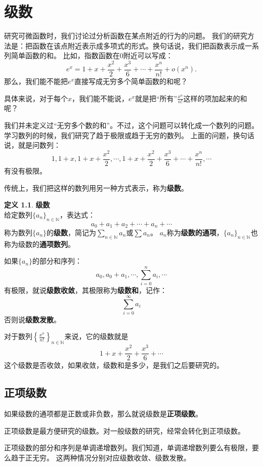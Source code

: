 \documentclass[12pt,UTF8]{ctexbook}
\newcommand{\olim}[1]{\mathit{o}\left(#1\right)}  %
\theoremstyle{definition}
\newtheorem{df}{定义}[section]
\theoremstyle{plain}
\begin{document}
\chapter{级数}
研究可微函数时，我们讨论过分析函数在某点附近的行为的问题。
我们的研究方法是：把函数在该点附近表示成多项式的形式。换句话说，我们把函数表示成一系列简单函数的和。
比如，指数函数在$0$附近可以写成：
$$e^x = 1 + x + \frac{x^2}{2} + \frac{x^3}{6} + \cdots + \frac{x^n}{n!} + \olim{x^n}.$$
那么，我们能不能把$e^x$直接写成无穷多个简单函数的和呢？

具体来说，对于每个$x$，我们能不能说，$e^x$就是把“所有”$\frac{x^n}{n!}$这样的项加起来的和呢？

我们并未定义过“无穷多个数的和”。不过，这个问题可以转化成一个数列的问题。
学习数列的时候，我们研究了趋于极限或趋于无穷的数列。
上面的问题，换句话说，就是问数列：
$$ 1, 1+x, 1+x + \frac{x^2}{2}, \cdots , 1 + x + \frac{x^2}{2} + \frac{x^3}{6} + \cdots + \frac{x^n}{n!}, \cdots $$
有没有极限。

传统上，我们把这样的数列用另一种方式表示，称为\textbf{级数}。

\begin{df}{\textbf{级数}}
    \mbox{} \\
    给定数列$\{a_n\}_{n\in\mathbb{N}}$，表达式：
    $$ a_0 + a_1 + a_2 + \cdots + a_n + \cdots $$
    称为数列$\{a_n\}$的\textbf{级数}，简记为$\sum_{n\in\mathbb{N}} a_n$或$\sum a_n$。
    $a_n$称为\textbf{级数的通项}，$\{a_n\}_{n\in\mathbb{N}}$也称为级数的\textbf{通项数列}。
    
    如果$\{a_n\}$的部分和序列：
    $$ a_0, a_0 + a_1, \cdots , \sum_{i=0}^n a_i, \cdots $$
    有极限，就说\textbf{级数收敛}，其极限称为\textbf{级数和}，记作：
    $$ \sum_{i=0}^\infty a_i $$
    否则说\textbf{级数发散}。
    
\end{df}

对于数列$\left\{\frac{x^n}{n!}\right\}_{n\in\mathbb{N}}$来说，它的级数就是
$$ 1 + x + \frac{x^2}{2} + \frac{x^3}{6} + \cdots $$
这个级数是否收敛，如果收敛，级数和是多少，是我们之后要研究的。

\section{正项级数}

如果级数的通项都是正数或非负数，那么就说级数是\textbf{正项级数}。

正项级数是最方便研究的级数。对一般级数的研究，经常会转化到正项级数。

正项级数的部分和序列是单调递增数列。我们知道，单调递增数列要么有极限，要么趋于正无穷。
这两种情况分别对应级数收敛、级数发散。
\end{document}
